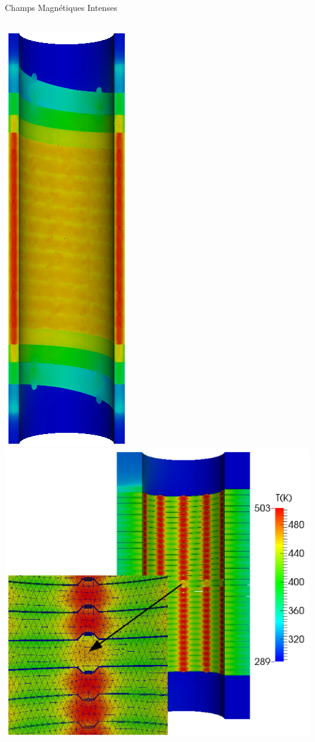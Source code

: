\begin{frame}{Champs Magnétiques Intenses}
  \begin{columns}[c]
    \includegraphics[height=.4\textheight]{Figures/cmi/temperature_newton_HL31_bmap+dilat_ws2.png}
    \includegraphics[height=.4\textheight]{Figures/cmi/temp_picard_np1024_OT200l170_comp.png}

\end{columns}
\end{frame}

